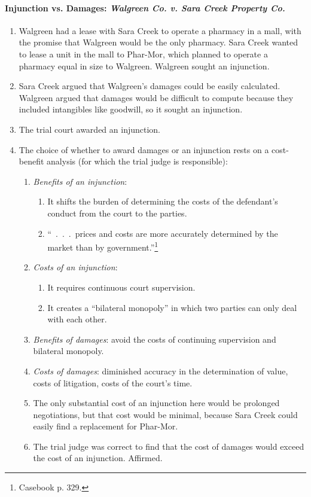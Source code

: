 \paragraph{Injunction vs. Damages: \emph{Walgreen Co. v. Sara Creek Property 
Co.}}

\begin{enumerate}
    \item Walgreen had a lease with Sara Creek to operate a pharmacy in a 
    mall, with the promise that Walgreen would be the only pharmacy. Sara 
    Creek wanted to lease a unit in the mall to Phar-Mor, which planned to 
    operate a pharmacy equal in size to Walgreen. Walgreen sought an 
    injunction.
    \item Sara Creek argued that Walgreen's damages could be easily 
    calculated. Walgreen argued that damages would be difficult to compute 
    because they included intangibles like goodwill, so it sought an 
    injunction.
    \item The trial court awarded an injunction.
    \item The choice of whether to award damages or an injunction rests on a 
    cost-benefit analysis (for which the trial judge is responsible):
    \begin{enumerate}
        \item \emph{Benefits of an injunction}:
        \begin{enumerate}
            \item It shifts the burden of determining the costs of the 
            defendant's conduct from the court to the parties.
            \item ``~.~.~.~prices and costs are more accurately determined by 
            the market than by government.''\footnote{Casebook p. 329.}
        \end{enumerate}
        \item \emph{Costs of an injunction}:
        \begin{enumerate}
            \item It requires continuous court supervision.
            \item It creates a ``bilateral monopoly'' in which two parties can 
            only deal with each other.
        \end{enumerate}
        \item \emph{Benefits of damages}: avoid the costs of continuing 
        supervision and bilateral monopoly.
        \item \emph{Costs of damages}: diminished accuracy in the 
        determination of value, costs of litigation, costs of the court's 
        time.
        \item The only substantial cost of an injunction here would be 
        prolonged negotiations, but that cost would be minimal, because Sara 
        Creek could easily find a replacement for Phar-Mor.
        \item The trial judge was correct to find that the cost of damages 
        would exceed the cost of an injunction. Affirmed.
    \end{enumerate}
\end{enumerate}

